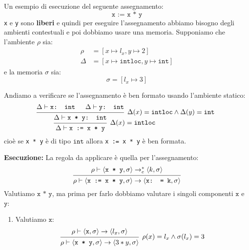 \documentclass[a4paper]{article}
\begin{document}
\begin{example}
  Un esempio di esecuzione del seguente assegnamento:
  \[
    \texttt{x := x * y}
  \] 
  \texttt{x} e \texttt{y} sono \textbf{liberi} e quindi per eseguire l'assegnamento
  abbiamo bisogno degli ambienti contestuali e poi dobbiamo usare una memoria.
  Supponiamo che l'ambiente \( \rho \) sia:
  \[
    \begin{aligned}
      \rho &= \left[ x \mapsto l_x, y \mapsto 2 \right] \\
      \Delta &= \left[ x \mapsto \texttt{intloc}, y \mapsto \texttt{int} \right]
    \end{aligned}
  \] 
  e la memoria \( \sigma \) sia:
  \[
    \sigma = \left[ l_x \mapsto 3 \right]
  \] 

  \vspace{1em}
  \noindent
  Andiamo a verificare se l'assegnamento è ben formato usando l'ambiente statico:
  \[
    \begin{prooftree}
      \hypo{ 
        \Delta \vdash \texttt{x: int}
      }
      \hypo{ 
        \Delta \vdash \texttt{y: int}
      }
      \infer2[\( \Delta(x) = \texttt{intloc} \land \Delta(y) = \texttt{int} \) ]{ 
        \Delta \vdash \texttt{x * y: int}
      }
      \infer1[\( \Delta(x) = \texttt{intloc} \) ]{ 
        \Delta \vdash \texttt{x := x * y}
      }
    \end{prooftree}
  \] 
  cioè se \texttt{x * y} è di tipo \( \texttt{int} \) allora \texttt{x := x * y} è
  ben formata.

  \vspace{1em}
  \noindent
  \textbf{Esecuzione:}
  La regola da applicare è quella per l'assegnamento:
  \[
    \begin{prooftree}
      \hypo{ 
        \rho \vdash \left< \texttt{x * y}, \sigma \right> \to^*_e \left< k, \sigma \right>
      }
      \infer1{ 
        \rho \vdash \left< \texttt{x := x * y}, \sigma  \right>
        \to \left< \texttt{x: = k}, \sigma  \right>
      }
    \end{prooftree}
  \] 
  Valutiamo \( \texttt{x * y} \), ma prima per farlo dobbiamo valutare i singoli
  componenti \( \texttt{x} \) e \( \texttt{y} \):
  \begin{enumerate}
    \item Valutiamo \( \texttt{x} \):
      \[
        \begin{prooftree}
          \hypo{ 
            \rho \vdash \left< \texttt{x}, \sigma \right> \to \left< l_x, \sigma  \right>
          }
          \infer1[\( 
          \rho(x) = l_x \land \sigma(l_x) = 3
          \)]{ 
            \rho \vdash \left< \texttt{x * y}, \sigma \right> \to \left< 3 * y, \sigma  \right>
          }
        \end{prooftree}
      \] 


\end{enumerate}
\end{example}
\end{document}
